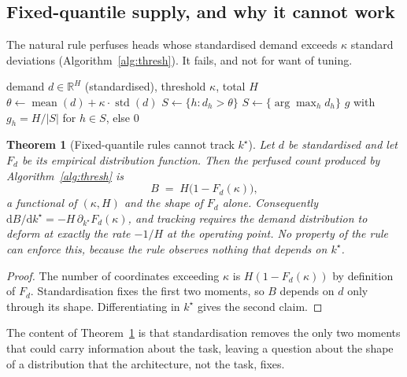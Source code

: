 \documentclass[11pt]{report}
\theoremstyle{plain}
\newtheorem{theorem}[proposition]{Theorem}
\theoremstyle{definition}
\theoremstyle{remark}
\begin{document}
\subsection{Fixed-quantile supply, and why it cannot work}

The natural rule perfuses heads whose standardised demand exceeds $\kappa$ standard
deviations (Algorithm~\ref{alg:thresh}). It fails, and not for want of tuning.

\begin{algorithm}[t]
\caption{Fixed-quantile supply}
\label{alg:thresh}
\begin{algorithmic}[1]
\Require demand $d \in \mathbb{R}^H$ (standardised), threshold $\kappa$, total $H$
\State $\theta \gets \operatorname{mean}(d) + \kappa \cdot \operatorname{std}(d)$
\State $S \gets \{h : d_h > \theta\}$
 \State $S \gets \{\arg\max_h d_h\}$
   \EndIf
\State \Return $g$ with $g_h = H/|S|$ for $h \in S$, else $0$
\end{algorithmic}
\end{algorithm}

\begin{theorem}[Fixed-quantile rules cannot track $k^\star$]
\label{thm:impossible}
Let $d$ be standardised and let $F_d$ be its empirical distribution function. Then the
perfused count produced by Algorithm~\ref{alg:thresh} is
\begin{equation}
  \label{eq:quantile}
  B \;=\; H\bigl(1 - F_d(\kappa)\bigr),
\end{equation}
a functional of $(\kappa, H)$ and the \emph{shape} of $F_d$ alone. Consequently
$\mathrm{d}B/\mathrm{d}k^\star = -H\,\partial_{k^\star} F_d(\kappa)$, and tracking
requires the demand distribution to deform at exactly the rate $-1/H$ at the operating
point. No property of the rule can enforce this, because the rule observes nothing that
depends on $k^\star$.
\end{theorem}

\begin{proof}
The number of coordinates exceeding $\kappa$ is $H(1-F_d(\kappa))$ by definition of
$F_d$. Standardisation fixes the first two moments, so $B$ depends on $d$ only through
its shape. Differentiating in $k^\star$ gives the second claim.
\end{proof}

The content of Theorem~\ref{thm:impossible} is that standardisation removes the only two
moments that could carry information about the task, leaving a question about the shape of
a distribution that the architecture, not the task, fixes.
\end{document}

